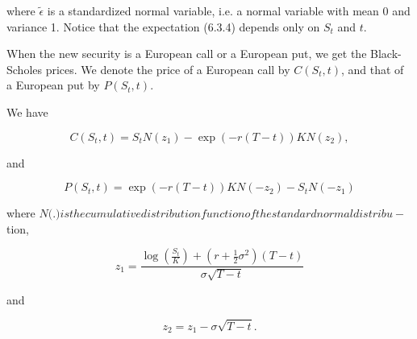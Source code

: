 \documentclass[\topdir/lecture\_notes.tex]{subfiles}
\begin{document}
where $\tilde{\epsilon}$ is a standardized normal variable, i.e. a normal variable with mean 0 and variance 1. Notice that the expectation (6.3.4) depends only on $S_{t}$ and $t$.

When the new security is a European call or a European put, we get the Black-Scholes prices. We denote the price of a European call by $C\left(S_{t}, t\right)$, and that of a European put by $P\left(S_{t}, t\right)$.

\begin{proposition}\label{prop:black_scholes_formulas}
We have

\begin{equation}
C\left(S_{t}, t\right)=S_{t} N\left(z_{1}\right)-\exp (-r(T-t)) K N\left(z_{2}\right), \label{eq:black_scholes_call}
\end{equation}

and

\begin{equation*}
P\left(S_{t}, t\right)=\exp (-r(T-t)) K N\left(-z_{2}\right)-S_{t} N\left(-z_{1}\right)
\end{equation*}

where $N($.$) is the cumulative distribution function of the standard normal distribu-$ tion,

\begin{equation*}
z_{1}=\frac{\log \left(\frac{S_{t}}{K}\right)+\left(r+\frac{1}{2} \sigma^{2}\right)(T-t)}{\sigma \sqrt{T-t}}
\end{equation*}

and

\begin{equation*}
z_{2}=z_{1}-\sigma \sqrt{T-t} .
\end{equation*}
\end{proposition}
\end{document}

